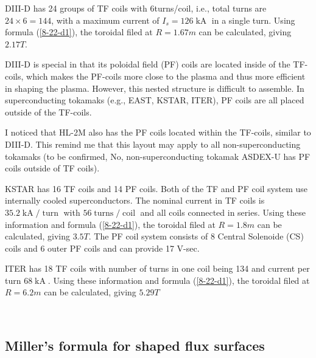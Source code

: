 \documentclass{article}
\newcommand{\tmop}[1]{\ensuremath{\operatorname{#1}}}
\begin{document}
DIII-D has 24 groups of TF coils with 6turns/coil, i.e., total turns are $24
\times 6 = 144$, with a maximum current of $I_s = 126 \tmop{kA}$ in a single
turn{\cite{Luxon2002}}. Using formula (\ref{8-22-d1}), the toroidal filed at
$R = 1.67 m$ can be calculated, giving $2.17 T$.

DIII-D is special in that its poloidal field (PF) coils are located inside of
the TF-coils, which makes the PF-coils more close to the plasma and thus more
efficient in shaping the plasma. However, this nested structure is difficult
to assemble. In superconducting tokamaks (e.g., EAST, KSTAR, ITER), PF coils
are all placed outside of the TF-coils.

I noticed that HL-2M also has the PF coils located within the TF-coils,
similar to DIII-D. This remind me that this layout may apply to all
non-superconducting tokamaks (to be confirmed, No, non-superconducting tokamak
ASDEX-U has PF coils outside of TF coils).

KSTAR has 16 TF coils and 14 PF coils. Both of the TF and PF coil system use
internally cooled superconductors. The nominal current in TF coils is $35.2
\tmop{kA} / \tmop{turn}$ with $56 \tmop{turns} / \tmop{coil}$ and all coils
connected in series{\cite{song2007}}. Using these information and formula
(\ref{8-22-d1}), the toroidal filed at $R = 1.8 m$ can be calculated, giving
$3.5 T$. The PF coil system consists of 8 Central Solenoide (CS) coils and 6
outer PF coils and can provide 17 V-sec.

ITER has 18 TF coils with number of turns in one coil being 134 and current
per turn $68 \tmop{kA}${\cite{sborchia2008}}. Using these information and
formula (\ref{8-22-d1}), the toroidal filed at $R = 6.2 m$ can be calculated,
giving $5.29 T$

\

\subsection{Miller's formula for shaped flux surfaces}
\end{document}
